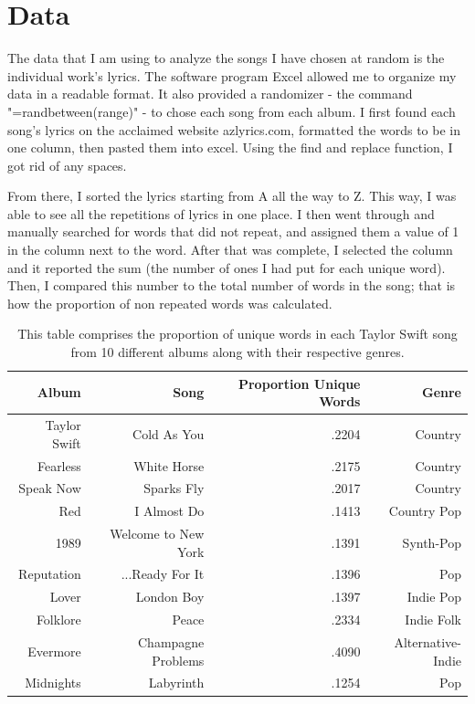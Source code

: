 \documentclass[12pt]{article}
\begin{document}
\section{Data}
\label{sec:data}

The data that I am using to analyze the songs I have chosen at random is the individual work's lyrics. The software program Excel allowed me to organize my data in a readable format. It also provided a randomizer - the command "=randbetween(range)" - to chose each song from each album. I first found each song's lyrics on the acclaimed website azlyrics.com, formatted the words to be in one column, then pasted them into excel. Using the find and replace function, I got rid of any spaces. 

From there, I sorted the lyrics starting from A all the way to Z. This way, I was able to see all the repetitions of lyrics in one place. I then went through and manually searched for words that did not repeat, and assigned them a value of 1 in the column next to the word. After that was complete, I selected the column and it reported the sum (the number of ones I had put for each unique word). Then, I compared this number to the total number of words in the song; that is how the proportion of non repeated words was calculated.



\begin{table}[tbp]
  \caption{This table comprises the proportion of unique words in each Taylor Swift song from 10 different albums along with their respective genres.}
  \label{tab:rv}
\centering
\begin{tabular}{rrrr}
  \toprule
Album & Song & Proportion Unique Words & Genre \\ 
  \midrule
Taylor Swift & Cold As You & .2204 & Country \\ 
  Fearless & White Horse & .2175 & Country \\ 
  Speak Now & Sparks Fly & .2017 & Country \\ 
  Red & I Almost Do & .1413 & Country Pop\\ 
  1989 & Welcome to New York & .1391 & Synth-Pop \\ 
  Reputation & ...Ready For It & .1396 & Pop\\ 
  Lover & London Boy & .1397 & Indie Pop \\ 
  Folklore & Peace & .2334 & Indie Folk \\ 
  Evermore & Champagne Problems & .4090 & Alternative-Indie\\ 
  Midnights & Labyrinth & .1254 & Pop\\ 
   \bottomrule
\end{tabular}
\end{table}
\end{document}
